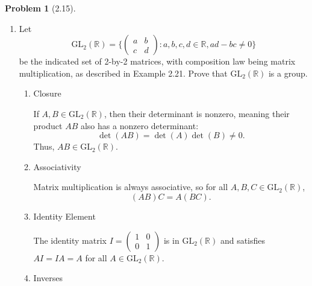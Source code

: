 \documentclass[12pt]{article}
\theoremstyle{definition}
\newtheorem{problem}{Problem}
\begin{document}
\begin{problem}[2.15]
    \begin{enumerate}[label=(\alph*)]
        \item Let
            \begin{equation*}
                \text{GL}_2(\mathbb{R}) = 
                \biggl\{ \begin{pmatrix} a & b \\ c & d \end{pmatrix} : a, b, c, d \in \mathbb{R}, ad - bc \neq 0 \biggr\}
            \end{equation*}
        be the indicated set of 2-by-2 matrices, with composition law being matrix multiplication, as
        described in Example 2.21. Prove that $\text{GL}_2(\mathbb{R})$ is a group.
        \begin{solution}
            \begin{enumerate}[label=(\roman*)]
                \item Closure 
                
                If $A, B \in \text{GL}_2(\mathbb{R})$, then their determinant is nonzero, meaning their product $AB$ also has a nonzero determinant:
                \[
                \det(AB) = \det(A) \det(B) \neq 0.
                \]
                Thus, $AB \in \text{GL}_2(\mathbb{R})$.
        
                \item Associativity
                
                Matrix multiplication is always associative, so for all $A, B, C \in \text{GL}_2(\mathbb{R})$,
                \[
                (AB)C = A(BC).
                \]
        
                \item Identity Element
                
                The identity matrix $I = \begin{pmatrix}1 & 0 \\ 0 & 1\end{pmatrix}$ is in $\text{GL}_2(\mathbb{R})$ and satisfies $AI = IA = A$ for all $A \in \text{GL}_2(\mathbb{R})$.
        
                \item Inverses
                

\end{enumerate}
\end{solution}
\end{enumerate}
\end{problem}
\end{document}
